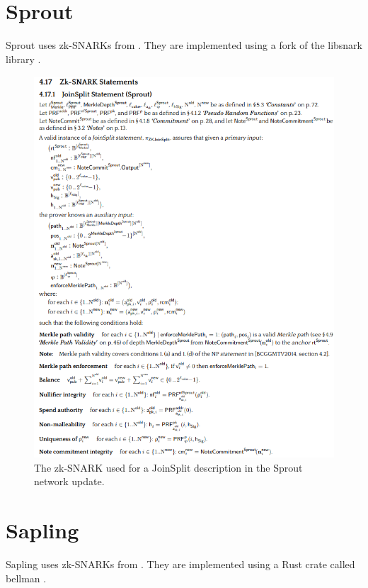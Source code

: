 \documentclass{article}
\begin{document}
\section{Sprout}

Sprout uses zk-SNARKs from \cite{bensasson:zksnark}. They are implemented using a fork of the libsnark library \cite{zcash:libsnark}.

\begin{figure}[t]
\includegraphics[width=\textwidth]{joinsplit-zksnark.png}
\caption{The zk-SNARK used for a JoinSplit description in the Sprout network update. \cite{hopwood:zcash}}
\centering
\end{figure}

\section{Sapling}

Sapling uses zk-SNARKs from \cite{groth:zksnark}. They are implemented using a Rust crate called bellman \cite{zcash:bellman}.
\end{document}
